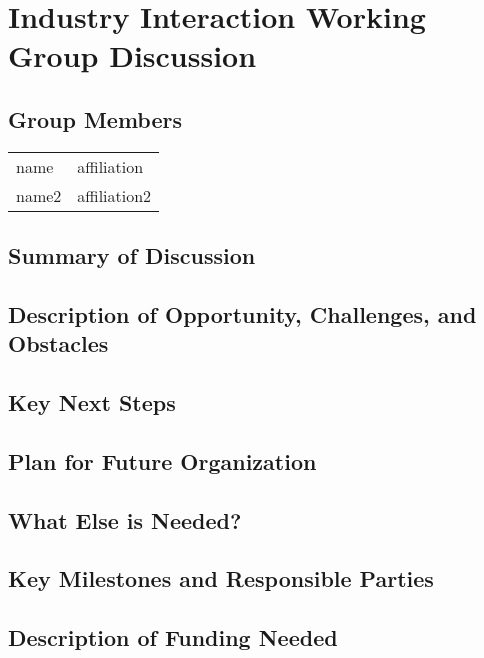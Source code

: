 \section{Industry Interaction Working Group Discussion}
\label{sec:appendix_industry_interaction}

\subsection{Group Members}
{\small
\begin{longtable}{ll}
   name            &  affiliation
\\ name2           &  affiliation2
\end{longtable}
}

\subsection{Summary of Discussion}

\subsection{Description of Opportunity, Challenges, and Obstacles}


\subsection{Key Next Steps}


\subsection{Plan for Future Organization}


\subsection{What Else is Needed?}


\subsection{Key Milestones and Responsible Parties}


\subsection{Description of Funding Needed}
